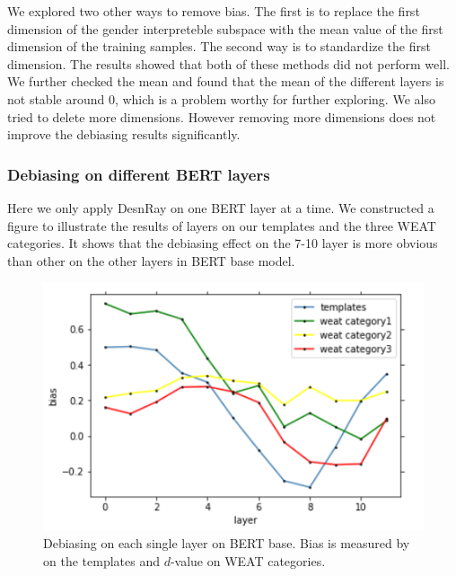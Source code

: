 We explored two other ways to remove bias. The first is to replace the first dimension of the gender interpreteble subspace with the mean value of the first dimension of the training samples. The second way is to standardize the first dimension. The results showed that both of these methods did not perform well. We further checked the mean and found that the mean of the different layers is not stable around 0, which is a problem worthy for further exploring. We also tried to delete more dimensions. However removing more dimensions does not improve the debiasing results significantly.


\subsubsection{Debiasing on different BERT layers}
Here we only apply DesnRay on one BERT layer at a time. We constructed a figure  to illustrate the results of layers on our templates and the three WEAT categories. It shows that the debiasing effect on the 7-10 layer is more obvious than other on the other layers in BERT base model.
\begin{figure}
	\centering
	\includegraphics[width=0.9\linewidth]{layers_base}
	\caption{Debiasing on each single layer on BERT base. Bias is measured by  on the templates and $d$-value on WEAT categories.}
\end{figure}

